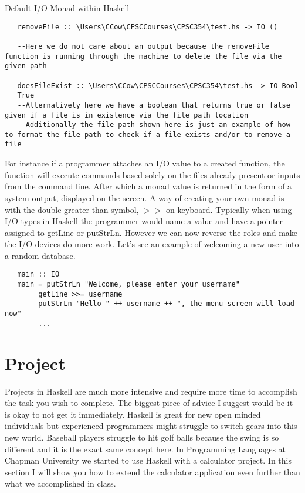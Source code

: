 \documentclass{article}
\begin{document}
\medskip
\caption{Default I/O Monad within Haskell}
\begin{lstlisting}
   removeFile :: \Users\CCow\CPSCCourses\CPSC354\test.hs -> IO ()
   
   --Here we do not care about an output because the removeFile function is running through the machine to delete the file via the given path
   
   doesFileExist :: \Users\CCow\CPSCCourses\CPSC354\test.hs -> IO Bool
   True
   --Alternatively here we have a boolean that returns true or false given if a file is in existence via the file path location
   --Additionally the file path shown here is just an example of how to format the file path to check if a file exists and/or to remove a file
\end{lstlisting}

\noindent For instance if a programmer attaches an I/O value to a created function, the function will execute commands based solely on the files already present or inputs from the command line. After which a monad value is returned in the form of a system output, displayed on the screen. A way of creating your own monad is with the double greater than symbol, $>>$ on keyboard. Typically when using I/O types in Haskell the programmer would name a value and have a pointer assigned to getLine or putStrLn. However we can now reverse the roles and make the I/O devices do more work. Let's see an example of welcoming a new user into a random database.

\begin{lstlisting}
   main :: IO
   main = putStrLn "Welcome, please enter your username"
        getLine >>= username
        putStrLn "Hello " ++ username ++ ", the menu screen will load now" 
        ...
\end{lstlisting}
    

\section{Project}

Projects in Haskell are much more intensive and require more time to accomplish the task you wish to complete. The biggest piece of advice I suggest would be it is okay to not get it immediately. Haskell is great for new open minded individuals but experienced programmers might struggle to switch gears into this new world. Baseball players struggle to hit golf balls because the swing is so different and it is the exact same concept here. In Programming Languages at Chapman University we started to use Haskell with a calculator project. In this section I will show you how to extend the calculator application even further than what we accomplished in class.
\end{document}
